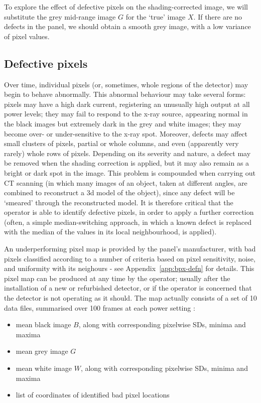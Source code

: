 \documentclass[\main/IO-Pixels.tex]{subfiles}
\begin{document}
To explore the effect of defective pixels on the shading-corrected image, we will substitute the grey mid-range image $G$ for the `true' image $X$. If there are no defects in the panel, we should obtain a smooth grey image, with a low variance of pixel values.

\subsection{Defective pixels}

Over time, individual pixels (or, sometimes, whole regions of the detector) may begin to behave abnormally. This abnormal behaviour may take several forms: pixels may have a high dark current, registering an unusually high output at all power levels; they may fail to respond to the x-ray source, appearing normal in the black images but extremely dark in the grey and white images; they may become over- or under-sensitive to the x-ray spot. Moreover, defects may affect small clusters of pixels, partial or whole columns, and even (apparently very rarely) whole rows of pixels. Depending on its severity and nature, a defect may be removed when the shading correction is applied, but it may also remain as a bright or dark spot in the image. This problem is compounded when carrying out CT scanning (in which many images of an object, taken at different angles, are combined to reconstruct a 3d model of the object), since any defect will be `smeared' through the reconstructed model. It is therefore critical that the operator is able to identify defective pixels, in order to apply a further correction (often, a simple median-switching approach, in which a known defect is replaced with the median of the values in its local neighbourhood, is applied).

An underperforming pixel map is provided by the panel's manufacturer, with bad pixels classified according to a number of criteria based on pixel sensitivity, noise, and uniformity with its neighours - see Appendix~\ref{app:bpx-defn} for details. This pixel map can be produced at any time by the operator; usually after the installation of a new or refurbished detector, or if the operator is concerned that the detector is not operating as it should. The map actually consists of a set of 10 data files, summarised over 100 frames at each power setting :

\begin{itemize}
    \item mean black image $B$, along with corresponding pixelwise SDs, minima and maxima
    \vspace{- .8\baselineskip}
    \item mean grey image $G$
    \vspace{- .8\baselineskip}
    \item mean white image $W$, along with corresponding pixelwise SDs, minima and maxima
    \vspace{- .8\baselineskip}
    \item list of coordinates of identified bad pixel locations
\end{itemize}
\end{document}
